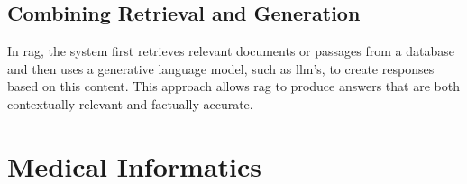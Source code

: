 \subsection{Combining Retrieval and Generation}\label{sec:combining-retrieval-generation}
In \ac{rag}, the system first retrieves relevant documents or passages from a database and then uses a generative language model, such as \ac{llm}'s, to create responses based on this content. 
This approach allows \ac{rag} to produce answers that are both contextually relevant and factually accurate.


\section{Medical Informatics}\label{sec:medical-informatics}

